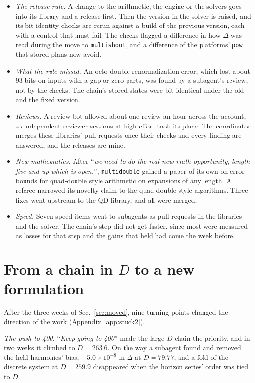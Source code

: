 \documentclass[aps,prd,onecolumn,superscriptaddress,nofootinbib,10pt]{revtex4-2}
\newcommand{\file}[1]{\texttt{#1}}
\newcommand{\prompt}[1]{``\textit{#1}''}
\begin{document}
\begin{itemize}
\item \emph{The release rule.} A change to the arithmetic, the engine or the solvers goes into its library and a release
first. Then the version in the solver is raised, and its bit-identity checks are rerun against a build of the previous
version, each with a control that must fail. The checks flagged a difference in how $\Delta$ was read during the move to
\file{multishoot}, and a difference of the platforms' \file{pow} that stored plans now avoid.
\item \emph{What the rule missed.} An octo-double renormalization error, which lost about 93 bits on inputs with a gap or
zero parts, was found by a subagent's review, not by the checks. The chain's stored states were bit-identical under the
old and the fixed version.
\item \emph{Reviews.} A review bot allowed about one review an hour across the account, so independent reviewer
sessions at high effort took its place. The coordinator merges these libraries' pull requests once their checks and
every finding are answered, and the releases are mine.
\item \emph{New mathematics.} After \prompt{we need to do the real new-math opportunity, length five and up which is open.},
\file{multidouble} gained a paper of its own on error bounds for quad-double style arithmetic on expansions of any
length. A referee narrowed its novelty claim to the quad-double style algorithms. Three fixes went upstream to the QD
library, and all were merged.
\item \emph{Speed.} Seven speed items went to subagents as pull requests in the libraries and the solver. The chain's
step did not get faster, since most were measured as losses for that step and the gains that held had come the week
before.
\end{itemize}

\section{From a chain in $D$ to a new formulation}
\label{sec:after}

After the three weeks of Sec.~\ref{sec:moved}, nine turning points changed the direction of the work
(Appendix~\ref{app:stuck2}).

\emph{The push to 400.} \prompt{Keep going to 400} made the large-$D$ chain the priority, and in two weeks it climbed to
$D = 263.6$. On the way a subagent found and removed the held harmonics' bias, $-5.0\times10^{-8}$ in $\Delta$ at
$D = 79.77$, and a fold of the discrete system at $D = 259.9$ disappeared when the horizon series' order was tied to $D$.
\end{document}
